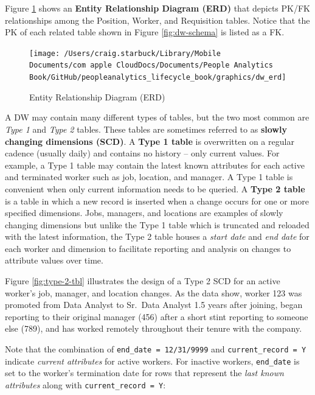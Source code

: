 \documentclass[]{book}
\begin{document}
Figure \ref{fig:dw-erd} shows an \textbf{Entity Relationship Diagram (ERD)} that depicts PK/FK relationships among the Position, Worker, and Requisition tables. Notice that the PK of each related table shown in Figure \ref{fig:dw-schema} is listed as a FK.

\begin{figure}

{\centering \texttt{[image: /Users/craig.starbuck/Library/Mobile Documents/com~apple~CloudDocs/Documents/People Analytics Book/GitHub/peopleanalytics\_lifecycle\_book/graphics/dw\_erd]} 

}

\caption{Entity Relationship Diagram (ERD)}\label{fig:dw-erd}
\end{figure}

A DW may contain many different types of tables, but the two most common are \emph{Type 1} and \emph{Type 2} tables. These tables are sometimes referred to as \textbf{slowly changing dimensions (SCD)}. A \textbf{Type 1 table} is overwritten on a regular cadence (usually daily) and contains no history -- only current values. For example, a Type 1 table may contain the latest known attributes for each active and terminated worker such as job, location, and manager. A Type 1 table is convenient when only current information needs to be queried. A \textbf{Type 2 table} is a table in which a new record is inserted when a change occurs for one or more specified dimensions. Jobs, managers, and locations are examples of slowly changing dimensions but unlike the Type 1 table which is truncated and reloaded with the latest information, the Type 2 table houses a \emph{start date} and \emph{end date} for each worker and dimension to facilitate reporting and analysis on changes to attribute values over time.

Figure \ref{fig:type-2-tbl} illustrates the design of a Type 2 SCD for an active worker's job, manager, and location changes. As the data show, worker 123 was promoted from Data Analyst to Sr.~Data Analyst 1.5 years after joining, began reporting to their original manager (456) after a short stint reporting to someone else (789), and has worked remotely throughout their tenure with the company.

Note that the combination of \texttt{end\_date\ =\ \textquotesingle{}12/31/9999\textquotesingle{}} and \texttt{current\_record\ =\ \textquotesingle{}Y\textquotesingle{}} indicate \emph{current attributes} for active workers. For inactive workers, \texttt{end\_date} is set to the worker's termination date for rows that represent the \emph{last known attributes} along with \texttt{current\_record\ =\ \textquotesingle{}Y\textquotesingle{}}:
\end{document}
